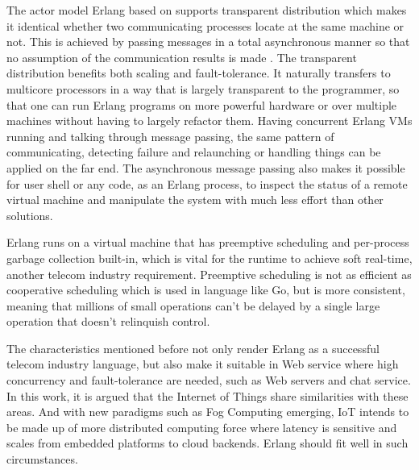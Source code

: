 The actor model Erlang based on supports transparent distribution which makes it identical whether two communicating processes locate at the same machine or not. This is achieved by passing messages in a total asynchronous manner so that no assumption of the communication results is made \cite{learn_you_some_erlang}. The transparent distribution benefits both scaling and fault-tolerance. It naturally transfers to multicore processors in a way that is largely transparent to the programmer, so that one can run Erlang programs on more powerful hardware or over multiple machines without having to largely refactor them. Having concurrent Erlang VMs running and talking through message passing, the same pattern of communicating, detecting failure and relaunching or handling things can be applied on the far end. The asynchronous message passing also makes it possible for user shell or any code, as an Erlang process, to inspect the status of a remote virtual machine and manipulate the system with much less effort than other solutions.  

Erlang runs on a virtual machine that has preemptive scheduling and per-process garbage collection built-in, which is vital for the runtime to achieve soft real-time, another telecom industry requirement. Preemptive scheduling is not as efficient as cooperative scheduling which is used in language like Go, but is more consistent, meaning that millions of small operations can't be delayed by a single large operation that doesn't relinquish control. 

The characteristics mentioned before not only render Erlang as a successful telecom industry language, but also make it suitable in Web service where high concurrency and fault-tolerance are needed, such as Web servers and chat service. In this work, it is argued that the Internet of Things share similarities with these areas. And with new paradigms such as Fog Computing emerging, IoT intends to be made up of more distributed computing force where latency is sensitive and scales from embedded platforms to cloud backends. Erlang should fit well in such circumstances. 

